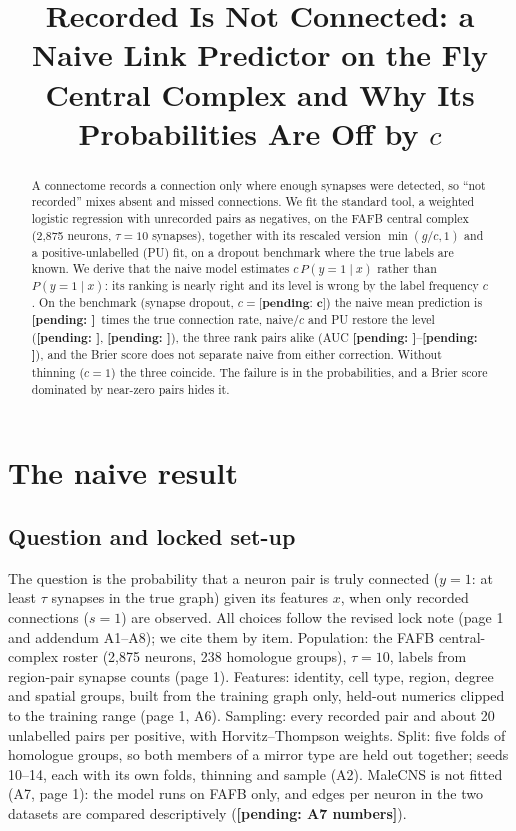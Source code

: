 \documentclass[conference]{IEEEtran}
\newcommand{\pending}[1]{\textbf{[pending: #1]}}
\providecommand{\CPrimary}{\pending{c}}\providecommand{\MeanY}{\pending{rate}}\providecommand{\PairsBelowFive}{\pending{share}}
\providecommand{\EdgesSentence}{\pending{A7 numbers}}
\providecommand{\LevelNaive}{\pending{}}\providecommand{\LevelNaiveC}{\pending{}}\providecommand{\LevelPU}{\pending{}}\providecommand{\LevelNaiveSD}{\pending{}}
\providecommand{\AUCNaive}{\pending{}}\providecommand{\AUCPU}{\pending{}}\providecommand{\PooledDzero}{\pending{}}\providecommand{\PooledDone}{\pending{}}\providecommand{\PooledDtwo}{\pending{}}
\begin{document}
\title{Recorded Is Not Connected: a Naive Link Predictor on the Fly Central Complex and Why Its Probabilities Are Off by $c$}
\author{}
\maketitle

\begin{abstract}
A connectome records a connection only where enough synapses were detected, so ``not recorded'' mixes absent and missed connections. We fit the standard tool, a weighted logistic regression with unrecorded pairs as negatives, on the FAFB central complex (2{,}875 neurons, $\tau=10$ synapses), together with its rescaled version $\min(g/c,1)$ and a positive-unlabelled (PU) fit, on a dropout benchmark where the true labels are known. We derive that the naive model estimates $c\,P(y{=}1\mid x)$ rather than $P(y{=}1\mid x)$: its ranking is nearly right and its level is wrong by the label frequency $c$. On the benchmark (synapse dropout, $c=\CPrimary$) the naive mean prediction is \LevelNaive\ times the true connection rate, naive/$c$ and PU restore the level (\LevelNaiveC, \LevelPU), the three rank pairs alike (AUC \AUCNaive--\AUCPU), and the Brier score does not separate naive from either correction. Without thinning ($c=1$) the three coincide. The failure is in the probabilities, and a Brier score dominated by near-zero pairs hides it.
\end{abstract}

\section{The naive result}
\subsection{Question and locked set-up}
The question is the probability that a neuron pair is truly connected ($y=1$: at least $\tau$ synapses in the true graph) given its features $x$, when only recorded connections ($s=1$) are observed. All choices follow the revised lock note (page 1 and addendum A1--A8); we cite them by item. Population: the FAFB central-complex roster (2{,}875 neurons, 238 homologue groups), $\tau=10$, labels from region-pair synapse counts (page 1). Features: identity, cell type, region, degree and spatial groups, built from the training graph only, held-out numerics clipped to the training range (page 1, A6). Sampling: every recorded pair and about 20 unlabelled pairs per positive, with Horvitz--Thompson weights. Split: five folds of homologue groups, so both members of a mirror type are held out together; seeds 10--14, each with its own folds, thinning and sample (A2). MaleCNS is not fitted (A7, page 1): the model runs on FAFB only, and edges per neuron in the two datasets are compared descriptively (\EdgesSentence).
\end{document}
